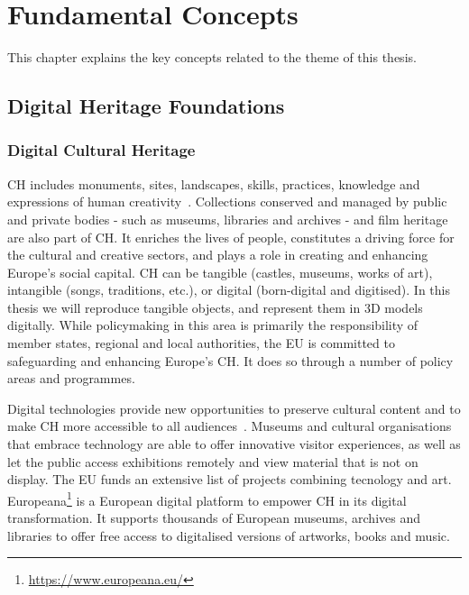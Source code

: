 
%

\chapter{Fundamental Concepts}
\label{cha:fundamental_concepts}

This chapter explains the key concepts related to the theme of this thesis.

\section{Digital Heritage Foundations}
\label{sec:digital_heritage_foundation}

\subsection{Digital Cultural Heritage}
\label{sec:digital_heritage}

\gls{CH} includes monuments, sites, landscapes, skills, practices, knowledge and expressions of human creativity~\cite{eu_cultural_heritage}. Collections conserved and managed by public and private bodies - such as museums, libraries and archives - and film heritage are also part of CH. It enriches the lives of people, constitutes a driving force for the cultural and creative sectors, and plays a role in creating and enhancing Europe's social capital.
\gls{CH} can be tangible (castles, museums, works of art), intangible (songs, traditions, etc.), or
digital (born-digital and digitised). In this thesis we will reproduce tangible objects, and represent them in \gls{3D} models digitally.
While policymaking in this area is primarily the responsibility of member states, regional and local authorities, the \gls{EU} is committed to safeguarding and enhancing Europe's \gls{CH}. It does so through a number of policy areas and programmes.


Digital technologies provide new opportunities to preserve cultural content and to make \gls{CH} more accessible to all audiences~\cite{eu_digital_heritage}. Museums and cultural organisations that embrace technology are able to offer innovative visitor experiences, as well as let the public access exhibitions remotely and view material that is not on display.
The \gls{EU} funds an extensive list of projects combining tecnology and art.
Europeana\footnote{\url{https://www.europeana.eu/}} is a European digital platform to empower \gls{CH} in its digital transformation. It supports thousands of European museums, archives and libraries to offer free access to digitalised versions of artworks, books and music.

